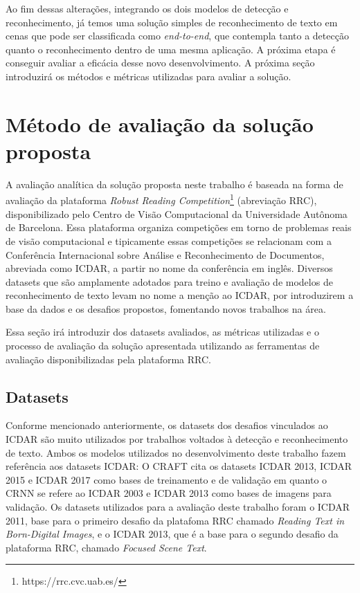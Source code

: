 Ao fim dessas alterações, integrando os dois modelos de detecção e reconhecimento, já temos uma solução simples de reconhecimento de texto em cenas que pode ser classificada como \textit{end-to-end}, que contempla tanto a detecção quanto o reconhecimento dentro de uma mesma aplicação. A próxima etapa é conseguir avaliar a eficácia desse novo desenvolvimento. A próxima seção introduzirá os métodos e métricas utilizadas para avaliar a solução.

\section{Método de avaliação da solução proposta}\label{sec:methodology_validation}

A avaliação analítica da solução proposta neste trabalho é baseada na forma de avaliação da plataforma \textit{Robust Reading Competition}\footnote{https://rrc.cvc.uab.es/} (abreviação RRC), disponibilizado pelo Centro de Visão Computacional da Universidade Autônoma de Barcelona. Essa plataforma organiza competições em torno de problemas reais de visão computacional e tipicamente essas competições se relacionam com a Conferência Internacional sobre Análise e Reconhecimento de Documentos, abreviada como ICDAR, a partir no nome da conferência em inglês. Diversos datasets que são amplamente adotados para treino e avaliação de modelos de reconhecimento de texto levam no nome a menção ao ICDAR, por introduzirem a base da dados e os desafios propostos, fomentando novos trabalhos na área.

Essa seção irá introduzir dos datasets avaliados, as métricas utilizadas e o processo de avaliação da solução apresentada utilizando as ferramentas de avaliação disponibilizadas pela plataforma RRC.

\subsection{Datasets}\label{sec:methodology_datasets}

Conforme mencionado anteriormente, os datasets dos desafios vinculados ao ICDAR são muito utilizados por trabalhos voltados à detecção e reconhecimento de texto. Ambos os modelos utilizados no desenvolvimento deste trabalho fazem referência aos datasets ICDAR: O CRAFT cita os datasets ICDAR 2013, ICDAR 2015 e ICDAR 2017 como bases de treinamento e de validação em quanto o CRNN se refere ao ICDAR 2003 e ICDAR 2013 como bases de imagens para validação. Os datasets utilizados para a avaliação deste trabalho foram o ICDAR 2011, base para o primeiro desafio da platafoma RRC chamado \textit{Reading Text in Born-Digital Images}, e o ICDAR 2013, que é a base para o segundo desafio da plataforma RRC, chamado \textit{Focused Scene Text}.

